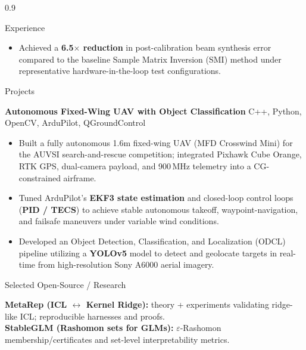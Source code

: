 \documentclass{resume} %
\begin{document}
\begin{spacing}{0.9}
\begin{rSection}{Experience}
\begin{itemize}
  \item Achieved a \textbf{6.5$\times$ reduction} in post-calibration beam synthesis error compared to the baseline Sample Matrix Inversion (SMI) method under representative hardware-in-the-loop test configurations.
  \vspace{-0.25em}

\end{itemize}
\vspace{-0.5em}

\end{rSection}

\begin{rSection}{Projects} 
\vspace{-0.5em}

\textbf{Autonomous Fixed-Wing UAV with Object Classification} \hfill {\small C++, Python, OpenCV, ArduPilot, QGroundControl}

\vspace{-0.5em}
\begin{itemize}\itemsep -2pt
  \item Built a fully autonomous 1.6m fixed-wing UAV (MFD Crosswind Mini) for the AUVSI search-and-rescue competition; integrated Pixhawk Cube Orange, RTK GPS, dual-camera payload, and 900\,MHz telemetry into a CG-constrained airframe.
  \item Tuned ArduPilot's \textbf{EKF3 state estimation} and closed-loop control loops (\textbf{PID / TECS}) to achieve stable autonomous takeoff, waypoint-navigation, and failsafe maneuvers under variable wind conditions.
  \item Developed an Object Detection, Classification, and Localization (ODCL) pipeline utilizing a \textbf{YOLOv5} model to detect and geolocate targets in real-time from high-resolution Sony A6000 aerial imagery.
  \vspace{-0.25em}

\end{itemize}
\vspace{-0.5em}


\end{rSection}

\begin{rSection}{Selected Open-Source / Research}
\vspace{-0.5em}

\textbf{MetaRep (ICL $\leftrightarrow$ Kernel Ridge):} theory + experiments validating ridge-like ICL; reproducible harnesses and proofs. \\
\textbf{StableGLM (Rashomon sets for GLMs):} $\varepsilon$-Rashomon membership/certificates and set-level interpretability metrics. \\
\end{rSection}
\vspace{-0.5em}


\end{spacing}
\end{document}
